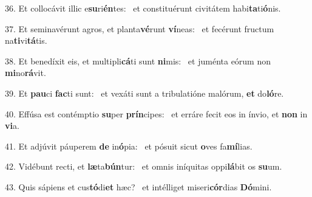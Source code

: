 36. Et collocávit illic e\textbf{su}ri\textbf{én}tes: \ast\  et constituérunt civitátem habi\textbf{ta}ti\textbf{ó}nis.\

37. Et seminavérunt agros, et planta\textbf{vé}runt \textbf{ví}neas: \ast\  et fecérunt fructum na\textbf{ti}vi\textbf{tá}tis.\

38. Et benedíxit eis, et multipli\textbf{cá}ti sunt \textbf{ni}mis: \ast\  et juménta eórum non \textbf{mi}no\textbf{rá}vit.\

39. Et \textbf{pau}ci \textbf{fac}ti sunt: \ast\  et vexáti sunt a tribulatióne malórum, \textbf{et} do\textbf{ló}re.\

40. Effúsa est contémptio \textbf{su}per \textbf{prín}cipes: \ast\  et erráre fecit eos in ínvio, et \textbf{non} in \textbf{vi}a.\

41. Et adjúvit páuperem \textbf{de} in\textbf{ó}pia: \ast\  et pósuit sicut \textbf{o}ves fa\textbf{mí}lias.\

42. Vidébunt recti, et \textbf{læ}ta\textbf{bún}tur: \ast\  et omnis iníquitas oppi\textbf{lá}bit os \textbf{su}um.\

43. Quis sápiens et cus\textbf{tó}di\textbf{et} hæc? \ast\  et intélliget miseri\textbf{cór}dias \textbf{Dó}mini.\

